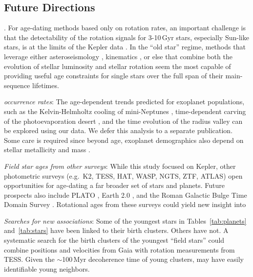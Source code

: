 \documentclass[11pt,twocolumn,tighten]{aastex63}
\begin{document}
\subsection{Future Directions}

. For
age-dating methods based only on rotation rates, an important challenge
is that the detectability of the rotation signals for 3-10\,Gyr stars,
especially Sun-like stars, is at the limits of the Kepler data
\citep{2022ApJ...937...94M}.  In the ``old star'' regime, methods that
leverage either asteroseismology
\citep{vanSaders_2016,2024ApJ...962..138S}, kinematics \citep{2021AJ....161..189L,See2024},
or else that combine both
the evolution of stellar luminosity and stellar rotation
\citep{Angus_2019,Claytor2020,2023ApJ...952..131M} seem the most
capable of providing useful age constraints for single stars over the
full span of their main-sequence lifetimes.

{\it {} occurrence rates}:
The age-dependent trends predicted for exoplanet populations, such as
the Kelvin-Helmholtz cooling of mini-Neptunes \citep{Gupta_2019},
time-dependent carving of the photoevaporation desert
\citep{Owen2018}, and the time evolution of the radius valley
\citep{Rogers_2021} can be explored using our data.  We defer this
analysis to a separate publication.  Some care is required since
beyond age, exoplanet demographics also depend on stellar metallicity
and mass \citep[e.g.][]{Petigura_2018,Miyazaki2023}.  

{\it Field star ages from other surveys}:
While this study focused on Kepler, other photometric surveys
(e.g.~K2, TESS, HAT, WASP, NGTS, ZTF, ATLAS) open opportunities for
age-dating a far broader set of stars and planets.  Future prospects
also include PLATO \citep{Rauer14}, Earth 2.0
\citep{2022arXiv220606693G}, and the Roman Galactic Bulge Time Domain
Survey \citep{Wilson2023}.  Rotational ages from these surveys could
yield new insight
into 

{\it Searches for new associations}:
Some of the youngest stars in Tables~\ref{tab:planets}
and~\ref{tab:stars} have been linked to their birth clusters.
Others have not. A systematic search for the birth clusters of the
youngest ``field stars'' could combine positions and velocities from
Gaia with rotation measurements from TESS. Given the $\sim$100\,Myr
decoherence time of young clusters,  may
have easily identifiable young neighbors.
\end{document}
